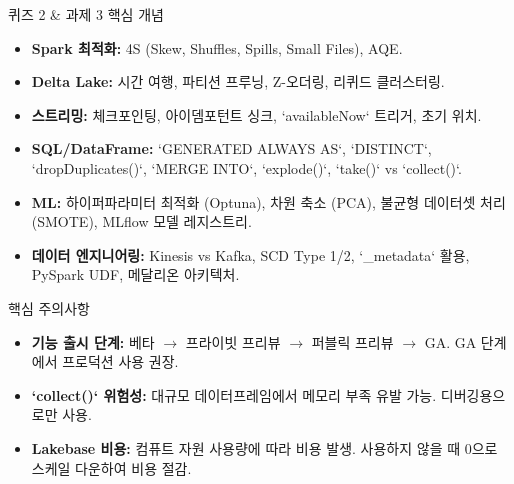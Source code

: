\documentclass[11pt,a4paper]{article}
\begin{document}
\begin{tcolorbox}[title=\textbf{Databricks Lecture 14 핵심 요약}, colback=white, colframe=black!20!white, sharp corners, boxrule=0.5mm, breakable]
\begin{summarybox}{퀴즈 2 & 과제 3 핵심 개념}
\begin{itemize}
    \item \textbf{Spark 최적화:} 4S (Skew, Shuffles, Spills, Small Files), AQE.
    \item \textbf{Delta Lake:} 시간 여행, 파티션 프루닝, Z-오더링, 리퀴드 클러스터링.
    \item \textbf{스트리밍:} 체크포인팅, 아이뎀포턴트 싱크, `availableNow` 트리거, 초기 위치.
    \item \textbf{SQL/DataFrame:} `GENERATED ALWAYS AS`, `DISTINCT`, `dropDuplicates()`, `MERGE INTO`, `explode()`, `take()` vs `collect()`.
    \item \textbf{ML:} 하이퍼파라미터 최적화 (Optuna), 차원 축소 (PCA), 불균형 데이터셋 처리 (SMOTE), MLflow 모델 레지스트리.
    \item \textbf{데이터 엔지니어링:} Kinesis vs Kafka, SCD Type 1/2, `_metadata` 활용, PySpark UDF, 메달리온 아키텍처.
\end{itemize}
\end{summarybox}

\begin{cautionbox}{핵심 주의사항}
\begin{itemize}
    \item \textbf{기능 출시 단계:} 베타 $\rightarrow$ 프라이빗 프리뷰 $\rightarrow$ 퍼블릭 프리뷰 $\rightarrow$ GA. GA 단계에서 프로덕션 사용 권장.
    \item \textbf{`collect()` 위험성:} 대규모 데이터프레임에서 메모리 부족 유발 가능. 디버깅용으로만 사용.
    \item \textbf{Lakebase 비용:} 컴퓨트 자원 사용량에 따라 비용 발생. 사용하지 않을 때 0으로 스케일 다운하여 비용 절감.
\end{itemize}
\end{cautionbox}

\end{tcolorbox}
\end{document}
